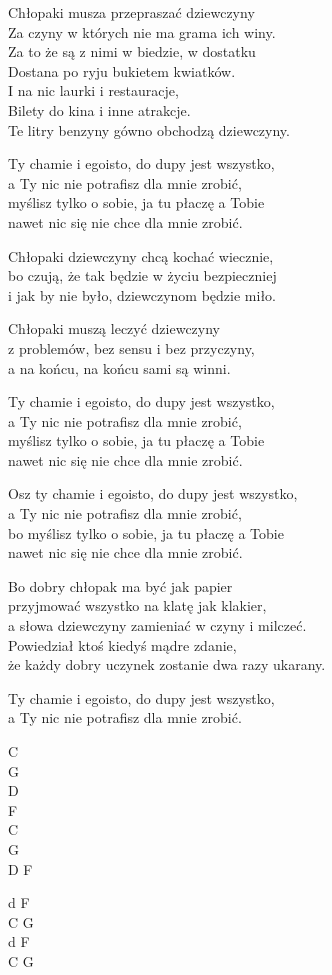 \begin{text}
    Chłopaki musza przepraszać dziewczyny\\
    Za czyny w których nie ma grama ich winy.\\
    Za to że są z nimi w biedzie, w dostatku\\
    Dostana po ryju bukietem kwiatków.\\
    I na nic laurki i restauracje,\\
    Bilety do kina i inne atrakcje.\\
    Te litry benzyny gówno obchodzą dziewczyny.


    \vin Ty chamie i egoisto, do dupy jest wszystko,\\
    \vin a Ty nic nie potrafisz dla mnie zrobić,\\
    \vin myślisz tylko o sobie, ja tu płaczę a Tobie\\
    \vin nawet nic się nie chce dla mnie zrobić.

    Chłopaki dziewczyny chcą kochać wiecznie,\\
    bo czują, że tak będzie w życiu bezpieczniej\\
    i jak by nie było, dziewczynom będzie miło.

    Chłopaki muszą leczyć dziewczyny\\
    z problemów, bez sensu i bez przyczyny,\\
    a na końcu, na końcu sami są winni.

    \vin Ty chamie i egoisto, do dupy jest wszystko,\\
    \vin a Ty nic nie potrafisz dla mnie zrobić,\\
    \vin myślisz tylko o sobie, ja tu płaczę a Tobie\\
    \vin nawet nic się nie chce dla mnie zrobić.

    \vin Osz ty chamie i egoisto, do dupy jest wszystko,\\
    \vin a Ty nic nie potrafisz dla mnie zrobić,\\
    \vin bo myślisz tylko o sobie, ja tu płaczę a Tobie\\
    \vin nawet nic się nie chce dla mnie zrobić.

    \vin Bo dobry chłopak ma być jak papier\\
    \vin przyjmować wszystko na klatę jak klakier,\\
    \vin a słowa dziewczyny zamieniać w czyny i milczeć.\\
    \vin Powiedział ktoś kiedyś mądre zdanie,\\
    \vin że każdy dobry uczynek zostanie dwa razy ukarany.

    \vin Ty chamie i egoisto, do dupy jest wszystko,\\
    \vin a Ty nic nie potrafisz dla mnie zrobić.
\end{text}
\begin{chord}
    C\\
    G\\
    D\\
    F\\
    C\\
    G\\
    D F

    d F\\
    C G\\
    d F\\
    C G
\end{chord}
